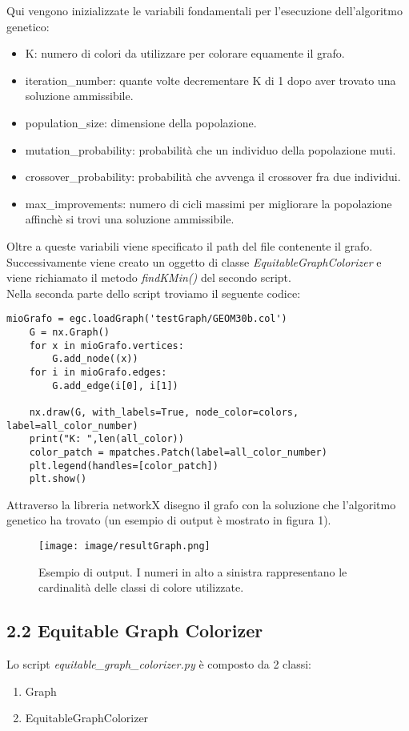 \documentclass[12pt]{article}
\begin{document}
\begin{flushleft}
Qui vengono inizializzate le variabili fondamentali per l'esecuzione dell'algoritmo genetico:
\begin{itemize}
 \item K: numero di colori da utilizzare per colorare equamente il grafo.
 \item iteration\_number: quante volte decrementare K di 1 dopo aver trovato una soluzione ammissibile.
 \item population\_size: dimensione della popolazione.
 \item mutation\_probability: probabilità che un individuo della popolazione muti.
 \item crossover\_probability: probabilità che avvenga il crossover fra due individui.
 \item max\_improvements: numero di cicli massimi per migliorare la popolazione affinchè si trovi una soluzione ammissibile.
\end{itemize}
Oltre a queste variabili viene specificato il path del file contenente il grafo.
\\Successivamente viene creato un oggetto di classe \textit{EquitableGraphColorizer} e viene richiamato il metodo 
\textit{findKMin()} del secondo script.\\[0.5\baselineskip]

Nella seconda parte dello script troviamo il seguente codice:
\begin{lstlisting}[belowskip=0.5 \baselineskip]
mioGrafo = egc.loadGraph('testGraph/GEOM30b.col')
    G = nx.Graph()
    for x in mioGrafo.vertices:
        G.add_node((x))
    for i in mioGrafo.edges:
        G.add_edge(i[0], i[1])

    nx.draw(G, with_labels=True, node_color=colors, label=all_color_number)
    print("K: ",len(all_color))
    color_patch = mpatches.Patch(label=all_color_number)
    plt.legend(handles=[color_patch])
    plt.show()
\end{lstlisting}
Attraverso la libreria networkX disegno il grafo con la soluzione che l'algoritmo genetico ha trovato 
(un esempio di output è mostrato in figura 1).

\begin{figure}
\vspace*{-2.5cm}
  \texttt{[image: image/resultGraph.png]}
  \caption{Esempio di output.
  I numeri in alto a sinistra rappresentano le cardinalità delle classi di colore utilizzate.}
\end{figure}

\subsection*{2.2 Equitable Graph Colorizer}
Lo script \textit{equitable\_graph\_colorizer.py} è composto da 2 classi:
\begin{enumerate}
\item Graph
\item EquitableGraphColorizer
\end{enumerate}


\end{flushleft}
\end{document}
